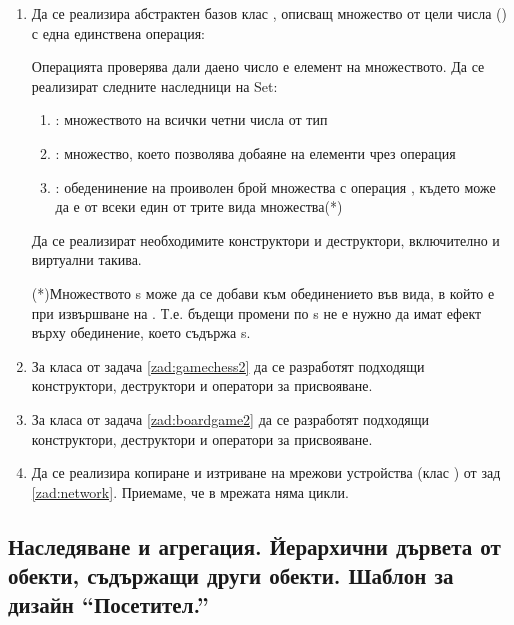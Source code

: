 \begin{enumerate}[resume]
  \item Да се реализира абстрактен базов клас , описващ множество от цели числа () с една единствена операция:
  

  Операцията проверява дали даено число е елемент на множеството. Да се реализират следните наследници на Set:

  \begin{enumerate}[label=\alph*)]
    \item {}: множеството на всички четни числа от тип 
    \item {}: множество, което позволява добаяне на елементи чрез операция 
    \item {}: обеденинение на проиволен брой множества с операция , където  може да е от всеки един от трите вида множества(*)
  \end{enumerate}

  Да се реализират необходимите конструктори и деструктори, включително и виртуални такива.

  (*)Множеството s може да се добави към обединението във вида, в който е при извършване на . Т.е. бъдещи промени по s не е нужно да имат ефект върху обединение, което съдържа s.

  \item За класа  от задача \ref{zad:gamechess2} да се разработят подходящи конструктори, деструктори и оператори за присвояване.
  \item За класа  от задача \ref{zad:boardgame2} да се разработят подходящи конструктори, деструктори и оператори за присвояване.
  \item Да се реализира копиране и изтриване на мрежови устройства (клас ) от зад \ref{zad:network}. Приемаме, че в мрежата няма цикли.
\end{enumerate}


\pagebreak

\subsection {Наследяване и агрегация. Йерархични дървета от обекти, съдържащи други обекти. Шаблон за дизайн ``Посетител.''}

